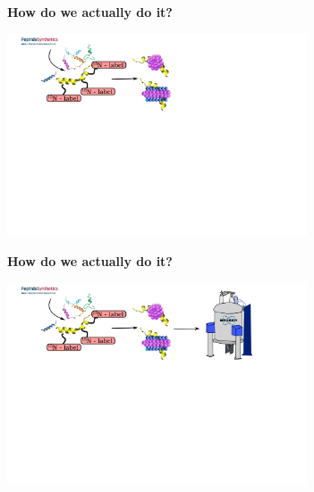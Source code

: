 \documentclass{beamer}
\begin{document}
\addtocounter{framenumber}{-1}
\begin{frame}
\begin{center}
\Large{\centering
\textbf{How do we actually do it?} \\}

\vspace{0.5cm}

\includegraphics[height=6cm]{what_we_do10.pdf}
\end{center}
\end{frame}


\addtocounter{framenumber}{-1}
\begin{frame}
\begin{center}
\Large{\centering
\textbf{How do we actually do it?} \\}

\vspace{0.5cm}

\includegraphics[height=6cm]{what_we_do9.pdf}
\end{center}
\end{frame}
\end{document}
